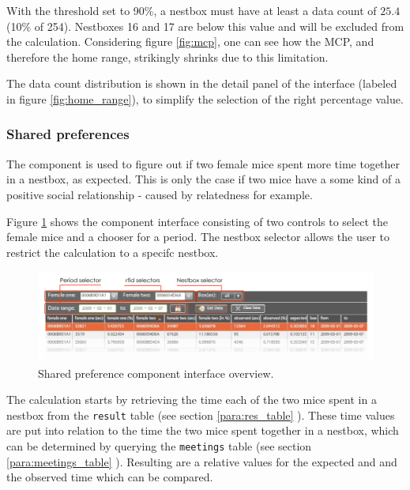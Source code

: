 With the threshold set to 90\%, a nestbox must have at least a data count of $25.4$ (10\% of 254). Nestboxes 16 and 17 are below this value and will be excluded from the calculation. Considering figure \ref{fig:mcp}, one can see how the MCP, and therefore the home range, strikingly shrinks due to this limitation. 

The data count distribution is shown in the detail panel of the interface (labeled in figure \ref{fig:home_range}), to simplify the selection of the right percentage value.     

\subsubsection{Shared preferences}
\label{subsubsec:sharedpref}

The component is used to figure out if two female mice spent more time together in a nestbox, as expected. This is only the case if two mice have a some kind of a positive social relationship - caused by relatedness for example.

Figure \ref{fig:shared_pref} shows the component interface consisting of two controls to select the female mice and a chooser for a period. The nestbox selector allows the user to restrict the calculation to a specifc nestbox.

\begin{figure}[htpb]
\begin{center}
  \includegraphics[width=\textwidth]{assets/pdf/shared_pref.pdf}
  \caption[Shared preference component interface]{Shared preference component interface overview.}
  \label{fig:shared_pref}
\end{center}
\end{figure}

The calculation starts by retrieving the time each of the two mice spent in a nestbox from the \lstinline|result| table (see section \ref{para:res_table} \pageref{para:res_table}). These time values are put into relation to the time the two mice spent together in a nestbox, which can be determined by querying the \lstinline|meetings| table (see section \ref{para:meetings_table} \pageref{para:meetings_table}). Resulting are a relative values for the expected and and the observed time which can be compared. 

